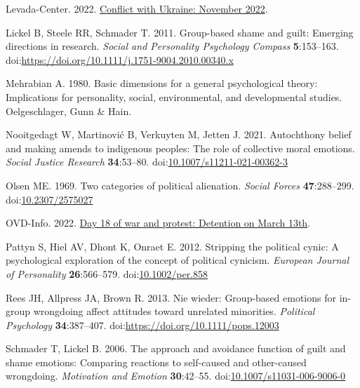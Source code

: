 \documentclass[
]{article}
\newlength{\cslhangindent}
\newlength{\cslentryspacingunit} %
\newenvironment{CSLReferences}[2] %
 {%
  \setlength{\parindent}{0pt}
  \ifodd #1
  \let\oldpar\par
  \def\par{\hangindent=\cslhangindent\oldpar}
  \fi
  \setlength{\parskip}{#2\cslentryspacingunit}
 }%
 {}
\begin{document}
\begin{CSLReferences}{1}{0}
\leavevmode{}%
Levada-Center. 2022. \href{https://www.levada.ru/en/2022/12/12/conflict-with-ukraine-november-2022/}{Conflict with {Ukraine: November} 2022}.

\leavevmode{}%
Lickel B, Steele RR, Schmader T. 2011. Group-based shame and guilt: Emerging directions in research. \emph{Social and Personality Psychology Compass} \textbf{5}:153--163. doi:\url{https://doi.org/10.1111/j.1751-9004.2010.00340.x}

\leavevmode{}%
Mehrabian A. 1980. Basic dimensions for a general psychological theory: Implications for personality, social, environmental, and developmental studies. Oelgeschlager, Gunn \& Hain.

\leavevmode{}%
Nooitgedagt W, Martinović B, Verkuyten M, Jetten J. 2021. Autochthony belief and making amends to indigenous peoples: The role of collective moral emotions. \emph{Social Justice Research} \textbf{34}:53--80. doi:\href{https://doi.org/10.1007/s11211-021-00362-3}{10.1007/s11211-021-00362-3}

\leavevmode{}%
Olsen ME. 1969. Two categories of political alienation. \emph{Social Forces} \textbf{47}:288--299. doi:\href{https://doi.org/10.2307/2575027}{10.2307/2575027}

\leavevmode{}%
OVD-Info. 2022. \href{https://en.ovdinfo.org/day-18-war-and-protest-detention-march-13th}{Day 18 of war and protest: Detention on {March} 13th}.

\leavevmode{}%
Pattyn S, Hiel AV, Dhont K, Onraet E. 2012. Stripping the political cynic: A psychological exploration of the concept of political cynicism. \emph{European Journal of Personality} \textbf{26}:566--579. doi:\href{https://doi.org/10.1002/per.858}{10.1002/per.858}

\leavevmode{}%
Rees JH, Allpress JA, Brown R. 2013. Nie wieder: Group-based emotions for in-group wrongdoing affect attitudes toward unrelated minorities. \emph{Political Psychology} \textbf{34}:387--407. doi:\url{https://doi.org/10.1111/pops.12003}

\leavevmode{}%
Schmader T, Lickel B. 2006. The approach and avoidance function of guilt and shame emotions: Comparing reactions to self-caused and other-caused wrongdoing. \emph{Motivation and Emotion} \textbf{30}:42--55. doi:\href{https://doi.org/10.1007/s11031-006-9006-0}{10.1007/s11031-006-9006-0}


\end{CSLReferences}
\end{document}
